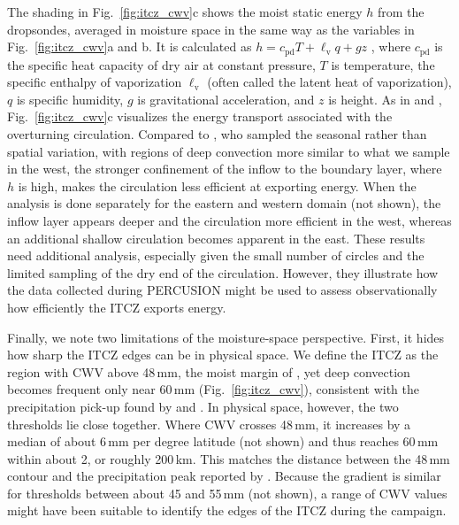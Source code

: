 \documentclass[acp, manuscript]{copernicus}
\begin{document}
The shading in Fig.~\ref{fig:itcz_cwv}c shows the moist static energy $h$ from the dropsondes, averaged in moisture space in the same way as the variables in Fig.~\ref{fig:itcz_cwv}a and b. It is calculated as $h = c_\mathrm{pd} T + \ell_\mathrm{v} q + g z$ \citep{mayMetPyPythonPackage2016a}, where $c_\mathrm{pd}$ is the specific heat capacity of dry air at constant pressure, $T$ is temperature, the specific enthalpy of vaporization $\ell_\mathrm{v}$ (often called the latent heat of vaporization), $q$ is specific humidity, $g$ is gravitational acceleration, and $z$ is height.
As in \citet{Bretherton2005} and \citet{schulzObservingTropicalAtmosphere2018}, Fig.~\ref{fig:itcz_cwv}c visualizes the energy transport associated with the overturning circulation.
Compared to \citet{schulzObservingTropicalAtmosphere2018}, who sampled the seasonal rather than spatial variation, with regions of deep convection more similar to what we sample in the west, the stronger confinement of the inflow to the boundary layer, where $h$ is high, makes the circulation less efficient at exporting energy. 
When the analysis is done separately for the eastern and western domain (not shown), the inflow layer appears deeper and the circulation more efficient in the west, whereas an additional shallow circulation becomes apparent in the east.
These results need additional analysis, especially given the small number of circles and the limited sampling of the dry end of the circulation. However, they illustrate how the data collected during PERCUSION might be used to assess observationally how efficiently the ITCZ exports energy.

Finally, we note two limitations of the moisture-space perspective.
First, it hides how sharp the ITCZ edges can be in physical space. We define the ITCZ as the region with CWV above 48\,\unit{mm}, the moist margin of \citet{Mapes2018}, yet deep convection becomes frequent only near 60\,\unit{mm} (Fig.~\ref{fig:itcz_cwv}), consistent with the precipitation pick-up found by \citet{Bretherton2004} and \citet{Peters2006}. In physical space, however, the two thresholds lie close together. Where CWV crosses 48\,\unit{mm}, it increases by a median of about 6\,\unit{mm} per degree latitude (not shown) and thus reaches 60\,\unit{mm} within about 2\textdegree{}, or roughly 200\,\unit{km}. This matches the distance between the 48\,\unit{mm} contour and the precipitation peak reported by \citet{Mapes2018}. Because the gradient is similar for thresholds between about 45 and 55\,\unit{mm} (not shown), a range of CWV values might have been suitable to identify the edges of the ITCZ during the campaign.
\end{document}
